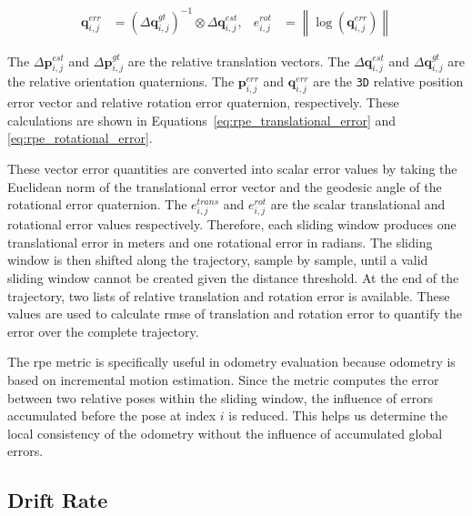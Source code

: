 \documentclass[report.tex]{subfiles}
\begin{document}
    \begin{equation}
        \begin{aligned}
            \mathbf{q}^{err}_{i,j}
            &=
            \left(
                \Delta \mathbf{q}^{gt}_{i,j}
            \right)^{-1}
            \otimes
            \Delta \mathbf{q}^{est}_{i,j},
            &
            e^{rot}_{i,j}
            &=
            \left\|
                \log
                \left(
                    \mathbf{q}^{err}_{i,j}
                \right)
            \right\|
        \end{aligned}
        \label{eq:rpe_rotational_error}
    \end{equation}

    The $\Delta \mathbf{p}^{est}_{i,j}$ and $\Delta \mathbf{p}^{gt}_{i,j}$ are the relative translation vectors. The $\Delta \mathbf{q}^{est}_{i,j}$ and $\Delta \mathbf{q}^{gt}_{i,j}$ are the relative orientation quaternions. The $\mathbf{p}^{err}_{i,j}$ and $\mathbf{q}^{err}_{i,j}$ are the \texttt{3D} relative position error vector and relative rotation error quaternion, respectively. These calculations are shown in Equations~\ref{eq:rpe_translational_error} and \ref{eq:rpe_rotational_error}. 
       
    These vector error quantities are converted into scalar error values by taking the Euclidean norm of the translational error vector and the geodesic angle of the rotational error quaternion. The $e^{trans}_{i,j}$ and $e^{rot}_{i,j}$ are the scalar translational and rotational error values respectively. Therefore, each sliding window produces one translational error in meters and one rotational error in radians. The sliding window is then shifted along the trajectory, sample by sample, until a valid sliding window cannot be created given the distance threshold. At the end of the trajectory, two lists of relative translation and rotation error is available. These values are used to calculate \gls{rmse} of translation and rotation error to quantify the error over the complete trajectory. 
    
    The \gls{rpe} metric is specifically useful in odometry evaluation because odometry is based on incremental motion estimation. Since the metric computes the error between two relative poses within the sliding window, the influence of errors accumulated before the pose at index $i$ is reduced. This helps us determine the local consistency of the odometry without the influence of accumulated global errors.
    
    \subsection{Drift Rate}
    
\end{document}
